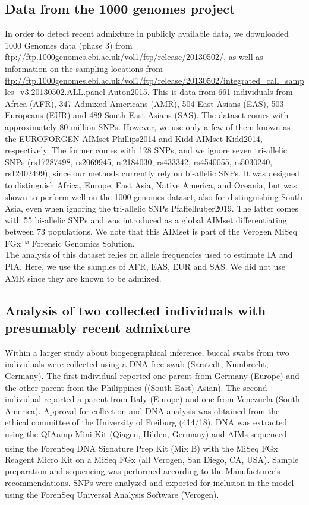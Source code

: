 \documentclass[12pt]{article}
\theoremstyle{definition}
\begin{document}
\subsection{Data from the 1000 genomes project}
\label{ss:1000}
In order to detect recent admixture in publicly available data, we downloaded 1000 Genomes data (phase 3) from \url{ftp://ftp.1000genomes.ebi.ac.uk/vol1/ftp/release/20130502/}, as well as information on the sampling locations from \url{ftp://ftp.1000genomes.ebi.ac.uk/vol1/ftp/release/20130502/integrated_call_samples_v3.20130502.ALL.panel} \cite{article}{Auton2015}. This is data from 661 individuals from Africa (AFR), 347 Admixed Americans (AMR), 504 East Asians (EAS), 503 Europeans (EUR) and 489 South-East Asians (SAS). The dataset comes with approximately 80 million SNPs. However, we use only a few of them known as the EUROFORGEN AIMset \cite{article}{Phillips2014} and Kidd AIMset \cite{article}{Kidd2014}, respectively. The former comes with 128 SNPs, and we ignore seven tri-allelic SNPs (rs17287498, rs2069945, rs2184030, rs433342, rs4540055, rs5030240, rs12402499), since our methods currently rely on bi-allelic SNPs. It was designed to distinguish Africa, Europe, East Asia, Native America, and Oceania, but was shown to perform well on the 1000 genomes dataset, also for distinguishing South Asia, even when ignoring the tri-allelic SNPs \cite{article}{Pfaffelhuber2019}.  The latter comes with 55 bi-allelic SNPs and was introduced as a global AIMset differentiating between 73 populations. We note that this AIMset is part of the Verogen MiSeq FGx™ Forensic Genomics Solution.
\\
The analysis of this dataset relies on allele frequencies used to estimate IA and PIA. Here, we use the samples of AFR, EAS, EUR and SAS. We did not use AMR since they are known to be admixed.

\subsection{Analysis of two collected individuals {\color{blue}with presumably recent admixture}}
\label{ss:AIMsself}
Within a larger study about biogeographical inference, buccal swabs from two individuals {\color{blue}were collected using a DNA-free swab (Sarstedt, Nümbrecht, Germany). The first individual reported one parent from Germany (Europe) and the other parent from the Philippines ((South-East)-Asian). The second individual reported a parent from Italy (Europe) and one from Venezuela (South America). }  Approval for collection and DNA analysis was obtained from the ethical committee of the University of Freiburg (414/18). DNA was extracted using the QIAamp Mini Kit (Qiagen, Hilden, Germany) and AIMs sequenced using the ForenSeq DNA Signature Prep Kit (Mix B) with the MiSeq FGx\textsuperscript{\textregistered} Reagent Micro Kit on a MiSeq FGx (all Verogen, San Diego, CA, USA). Sample preparation and sequencing was performed according to the Manufacturer's recommendations. SNPs were analyzed and exported for inclusion in the model using the
ForenSeq Universal Analysis Software (Verogen).
\end{document}
